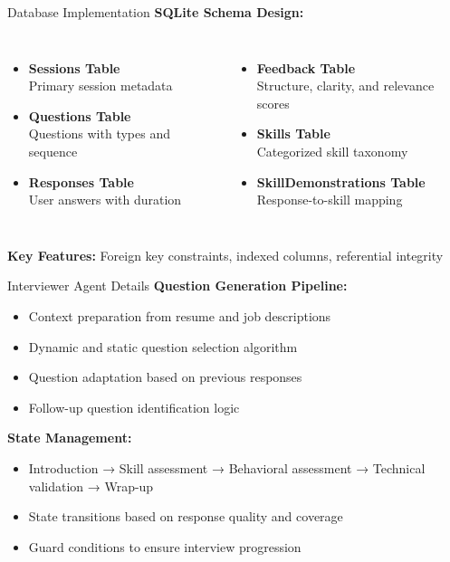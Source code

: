 \documentclass{beamer}
\begin{document}
\begin{frame}{Database Implementation}
    \textbf{SQLite Schema Design:}
    \begin{columns}[T,onlytextwidth]
        \begin{itemize}
            \item \textbf{Sessions Table}\\
            Primary session metadata
            \item \textbf{Questions Table}\\
            Questions with types and sequence
            \item \textbf{Responses Table}\\
            User answers with duration
        \end{itemize}
        
        \begin{itemize}
            \item \textbf{Feedback Table}\\
            Structure, clarity, and relevance scores
            \item \textbf{Skills Table}\\
            Categorized skill taxonomy
            \item \textbf{SkillDemonstrations Table}\\
            Response-to-skill mapping
        \end{itemize}
    \end{columns}
    
    \vspace{0.3cm}
    \textbf{Key Features:} Foreign key constraints, indexed columns, referential integrity
\end{frame}

\begin{frame}{Interviewer Agent Details}
    \textbf{Question Generation Pipeline:}
    \begin{itemize}
        \item Context preparation from resume and job descriptions
        \item Dynamic and static question selection algorithm
        \item Question adaptation based on previous responses
        \item Follow-up question identification logic
    \end{itemize}
    
    \textbf{State Management:}
    \begin{itemize}
        \item Introduction → Skill assessment → Behavioral assessment → Technical validation → Wrap-up
        \item State transitions based on response quality and coverage
        \item Guard conditions to ensure interview progression
    \end{itemize}
\end{frame}
\end{document}

